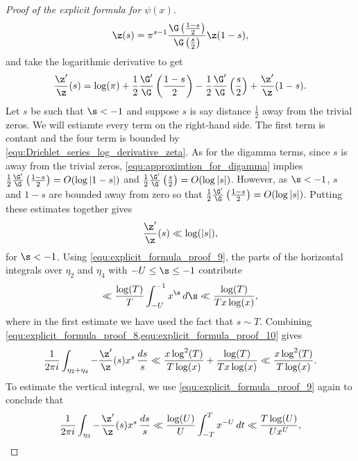 \begin{proof}[Proof of the explicit formula for $\psi(x)$]
        \[
          \z(s) = \pi^{s-1}\frac{\G\left(\frac{1-s}{2}\right)}{\G\left(\frac{s}{2}\right)}\z(1-s),
        \]
        and take the logarithmic derivative to get
        \[
          \frac{\z'}{\z}(s) = \log(\pi)+\frac{1}{2}\frac{\G'}{\G}\left(\frac{1-s}{2}\right)-\frac{1}{2}\frac{\G'}{\G}\left(\frac{s}{2}\right)+\frac{\z'}{\z}(1-s).
        \]
        Let $s$ be such that $\s < -1$ and suppose $s$ is say distance $\frac{1}{2}$ away from the trivial zeros. We will estiamte every term on the right-hand side. The first term is contant and the four term is bounded by \cref{equ:Drichlet_series_log_derivative_zeta}. As for the digamma terms, since $s$ is away from the trivial zeros, \cref{equ:approximtion_for_digamma} implies $\frac{1}{2}\frac{\G'}{\G}\left(\frac{1-s}{2}\right) = O(\log|1-s|)$ and $\frac{1}{2}\frac{\G'}{\G}\left(\frac{s}{2}\right) = O(\log|s|)$. However, as $\s < -1$, $s$ and $1-s$ are bounded away from zero so that $\frac{1}{2}\frac{\G'}{\G}\left(\frac{1-s}{2}\right) = O(\log|s|)$. Putting these estimates together gives
        \begin{equation}\label{equ:explicit_formula_proof_9}
          \frac{\z'}{\z}(s) \ll \log(|s|),
        \end{equation}
        for $\s < -1$. Using \cref{equ:explicit_formula_proof_9}, the parts of the horizontal integrals over $\eta_{2}$ and $\eta_{4}$ with $-U \le \s \le -1$ contribute
        \begin{equation}\label{equ:explicit_formula_proof_10}
          \ll \frac{\log(T)}{T}\int_{-U}^{-1}x^{\s}\,d\s \ll \frac{\log(T)}{Tx\log(x)},
        \end{equation}
        where in the first estimate we have used the fact that $s \sim T$. Combining \cref{equ:explicit_formula_proof_8,equ:explicit_formula_proof_10} gives
        \begin{equation}\label{equ:explicit_formula_proof_11}
          \frac{1}{2\pi i}\int_{\eta_{2}+\eta_{4}}-\frac{\z'}{\z}(s)x^{s}\,\frac{ds}{s} \ll \frac{x\log^{2}(T)}{T\log(x)}+\frac{\log(T)}{Tx\log(x)} \ll \frac{x\log^{2}(T)}{T\log(x)}.
        \end{equation}
        To estimate the vertical integral, we use \cref{equ:explicit_formula_proof_9} again to conclude that
        \begin{equation}\label{equ:explicit_formula_proof_12}
          \frac{1}{2\pi i}\int_{\eta_{3}}-\frac{\z'}{\z}(s)x^{s}\,\frac{ds}{s} \ll \frac{\log(U)}{U}\int_{-T}^{T}x^{-U}\,dt \ll \frac{T\log(U)}{Ux^{U}},
        \end{equation}

\end{proof}
